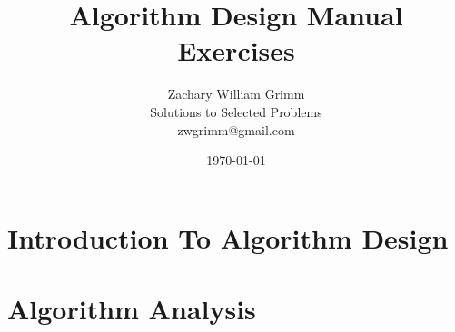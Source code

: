 \documentclass[10pt,letterpaper]{article}
\title{Algorithm Design Manual Exercises}
\author{Zachary William Grimm\\
  \small{Solutions to Selected Problems}\\
  \small{zwgrimm@gmail.com}
}
\date{\today{}}
\begin{document}
\maketitle

\tableofcontents{}

\newpage{}


\section{Introduction To Algorithm Design}




\section{Algorithm Analysis}










% 
\end{document}
